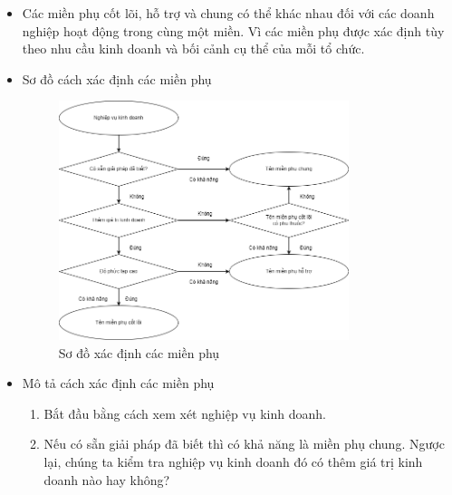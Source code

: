 





\begin{itemize}
    \item Các miền phụ cốt lõi, hỗ trợ và chung có thể khác nhau đối với các doanh nghiệp hoạt động trong cùng một miền. Vì các miền phụ được xác định tùy theo nhu cầu kinh doanh và bối cảnh cụ thể của mỗi tổ chức.





    \item     Sơ đồ cách xác định các miền phụ

          \begin{figure}[H]

              \centering

              \includegraphics[width = 0.8\textwidth]{pictures/XacDinhMienPhu/main.drawio.png}

              \caption{Sơ đồ xác định các miền phụ}

          \end{figure}

    \item     Mô tả cách xác định các miền phụ

          \begin{enumerate}

              \item Bắt đầu bằng cách xem xét nghiệp vụ kinh doanh.

              \item Nếu có sẵn giải pháp đã biết thì có khả năng là miền phụ chung. Ngược lại, chúng ta kiểm tra nghiệp vụ kinh doanh đó có thêm giá trị kinh doanh nào hay không?


\end{enumerate}
\end{itemize}
